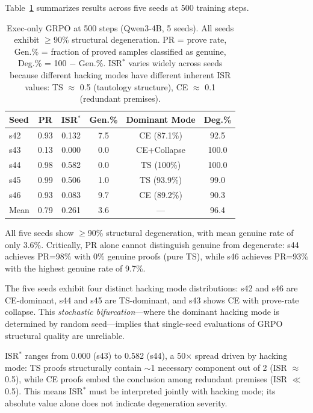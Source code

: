 \documentclass[11pt,a4paper]{article}
\newcommand{\isr}{\textsc{ISR}}
\newcommand{\pr}{\textsc{PR}}
\newcommand{\grpo}{\textsc{GRPO}}
\begin{document}
Table~\ref{tab:exec-only} summarizes results across five seeds at 500 training steps.

\begin{table}[t]
\centering
\small
\begin{tabular}{lccccc}
\toprule
Seed & \pr{} & \isr{}$^*$ & Gen.\% & Dominant Mode & Deg.\% \\
\midrule
s42 & 0.93 & 0.132 & 7.5 & CE (87.1\%) & 92.5 \\
s43 & 0.13 & 0.000 & 0.0 & CE+Collapse & 100.0 \\
s44 & 0.98 & 0.582 & 0.0 & TS (100\%) & 100.0 \\
s45 & 0.99 & 0.506 & 1.0 & TS (93.9\%) & 99.0 \\
s46 & 0.93 & 0.083 & 9.7 & CE (89.2\%) & 90.3 \\
\midrule
Mean & 0.79 & 0.261 & 3.6 & --- & 96.4 \\
\bottomrule
\end{tabular}
\caption{Exec-only \grpo{} at 500 steps (Qwen3-4B, 5 seeds). All seeds exhibit $\geq$90\% structural degeneration. \pr{} = prove rate, Gen.\% = fraction of proved samples classified as genuine, Deg.\% = 100 $-$ Gen.\%. \isr{}$^*$ varies widely across seeds because different hacking modes have different inherent \isr{} values: TS $\approx$ 0.5 (tautology structure), CE $\approx$ 0.1 (redundant premises).}
\label{tab:exec-only}
\end{table}

All five seeds show $\geq$90\% structural degeneration, with mean genuine rate of only 3.6\%.
Critically, \pr{} alone cannot distinguish genuine from degenerate: s44 achieves \pr{}=98\% with 0\% genuine proofs (pure TS), while s46 achieves \pr{}=93\% with the highest genuine rate of 9.7\%.

The five seeds exhibit four distinct hacking mode distributions: s42 and s46 are CE-dominant, s44 and s45 are TS-dominant, and s43 shows CE with prove-rate collapse.
This \emph{stochastic bifurcation}---where the dominant hacking mode is determined by random seed---implies that single-seed evaluations of \grpo{} structural quality are unreliable.

\isr{}$^*$ ranges from 0.000 (s43) to 0.582 (s44), a 50$\times$ spread driven by hacking mode: TS proofs structurally contain $\sim$1 necessary component out of 2 (\isr{} $\approx$ 0.5), while CE proofs embed the conclusion among redundant premises (\isr{} $\ll$ 0.5).
This means \isr{}$^*$ must be interpreted jointly with hacking mode; its absolute value alone does not indicate degeneration severity.
\end{document}

